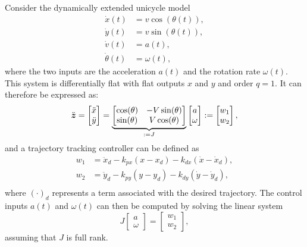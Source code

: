 \begin{example} \label{ex:trajtrack}
\theoremstyle{definition}
Consider the dynamically extended unicycle model
\begin{equation}
\begin{split}
\dot{x}(t) &= v \cos(\theta(t)), \\
\dot{y}(t) &= v \sin(\theta(t)), \\
\dot{v}(t) &= a(t), \\
\dot{\theta}(t) &= \omega(t),
\end{split}
\label{robot_eq_dyn}
\end{equation}
where the two inputs are the acceleration $a(t)$ and the rotation rate $\omega(t)$. This system is differentially flat with flat outputs $x$ and $y$ and order $q=1$. It can therefore be expressed as:
\begin{equation*}
\ddot{\bm{z}} = \begin{bmatrix} \ddot{x} \\ \ddot{y} \end{bmatrix} = \underbrace{\begin{bmatrix} \cos(\theta) & -V\sin(\theta) \\ \sin(\theta) & V\cos(\theta) \end{bmatrix}}_{:=J} \begin{bmatrix} a \\ \omega \end{bmatrix} := \begin{bmatrix} w_1 \\ w_2 \end{bmatrix},
\end{equation*}
and a trajectory tracking controller can be defined as
\begin{equation*}
\begin{split}
    w_1 &= \ddot{x}_d - k_{px}(x - x_d)- k_{dx}(\dot{x} - \dot{x}_d),\\
    w_2 &= \ddot{y}_d - k_{py}(y-y_d)- k_{dy}(\dot{y}-\dot{y}_d),\\
\end{split}
\end{equation*}
where $(\cdot)_d$ represents a term associated with the desired trajectory. The control inputs $a(t)$ and $\omega(t)$ can then be computed by solving the linear system
\begin{equation*}
J\begin{bmatrix} a \\ \omega \end{bmatrix} = \begin{bmatrix} w_1 \\ w_2 \end{bmatrix},
\end{equation*}
assuming that $J$ is full rank.
\end{example}


